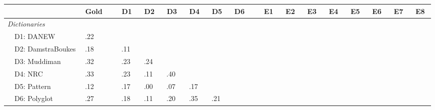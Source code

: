 \newcommand{\squeeze}[1]{$\!\!\!\!$#1$\!\!\!$}
\newcommand{\sectbreak}[1]{$\!\!\!$}
\begin{tabularx}{\textwidth}{lXlclllllllllllllll}
\toprule

& $\!\!\!\!\!$& \squeeze{ Gold }
& $\!\!\!\!\!$& \squeeze{ D1 }& \squeeze{ D2 }& \squeeze{ D3 }& \squeeze{ D4 }& \squeeze{ D5 }& \squeeze{ D6 }
& $\!\!\!\!\!$& \squeeze{ E1 }& \squeeze{ E2 }& \squeeze{ E3 }& \squeeze{ E4 }& \squeeze{ E5 }& \squeeze{ E6 }& \squeeze{ E7 }& \squeeze{ E8 }
\\
\midrule




 
\multicolumn{10}{l}{\emph{ Dictionaries }} \\
& D1: DANEW&\cellcolor[gray]{0.88}
 \squeeze{ .22 } &\sectbreak\ &&&&&& &\sectbreak\ &&&&&&&&\\
& D2: DamstraBoukes&\cellcolor[gray]{0.90}
 \squeeze{ .18 } &\sectbreak\ &\cellcolor[gray]{0.94}
 \squeeze{ .11 }&&&&& &\sectbreak\ &&&&&&&&\\
& D3: Muddiman&\cellcolor[gray]{0.83}
 \squeeze{ .32 } &\sectbreak\ &\cellcolor[gray]{0.88}
 \squeeze{ .23 }&\cellcolor[gray]{0.87}
 \squeeze{ .24 }&&&& &\sectbreak\ &&&&&&&&\\
& D4: NRC&\cellcolor[gray]{0.83}
 \squeeze{ .33 } &\sectbreak\ &\cellcolor[gray]{0.88}
 \squeeze{ .23 }&\cellcolor[gray]{0.94}
 \squeeze{ .11 }&\cellcolor[gray]{0.79}
 \squeeze{ .40 }&&& &\sectbreak\ &&&&&&&&\\
& D5: Pattern&\cellcolor[gray]{0.93}
 \squeeze{ .12 } &\sectbreak\ &\cellcolor[gray]{0.90}
 \squeeze{ .17 }&\cellcolor[gray]{1.00}
 \squeeze{ .00 }&\cellcolor[gray]{0.96}
 \squeeze{ .07 }&\cellcolor[gray]{0.91}
 \squeeze{ .17 }&& &\sectbreak\ &&&&&&&&\\
& D6: Polyglot&\cellcolor[gray]{0.86}
 \squeeze{ .27 } &\sectbreak\ &\cellcolor[gray]{0.90}
 \squeeze{ .18 }&\cellcolor[gray]{0.93}
 \squeeze{ .11 }&\cellcolor[gray]{0.89}
 \squeeze{ .20 }&\cellcolor[gray]{0.82}
 \squeeze{ .35 }&\cellcolor[gray]{0.88}
 \squeeze{ .21 }& &\sectbreak\ &&&&&&&&\\





\end{tabularx}
